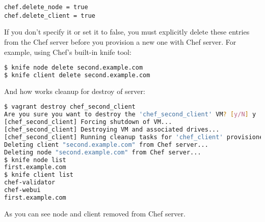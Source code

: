 \begin{lstlisting}[label=lst:my-server-cloud-node8]
chef.delete_node = true
chef.delete_client = true
\end{lstlisting}

If you don't specify it or set it to false, you must explicitly delete these entries from the Chef server before you provision a new one with Chef server. For example, using Chef's built-in knife tool:

\begin{lstlisting}[language=Bash,label=lst:my-server-cloud-node9]
$ knife node delete second.example.com
$ knife client delete second.example.com
\end{lstlisting}

And how works cleanup for destroy of server:

\begin{lstlisting}[language=Bash,label=lst:my-server-cloud-node11]
$ vagrant destroy chef_second_client
Are you sure you want to destroy the 'chef_second_client' VM? [y/N] y
[chef_second_client] Forcing shutdown of VM...
[chef_second_client] Destroying VM and associated drives...
[chef_second_client] Running cleanup tasks for 'chef_client' provisioner...
Deleting client "second.example.com" from Chef server...
Deleting node "second.example.com" from Chef server...
$ knife node list
first.example.com
$ knife client list
chef-validator
chef-webui
first.example.com
\end{lstlisting}

As you can see node and client removed from Chef server.